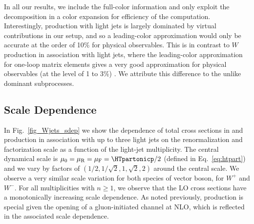 In all our results, we include the full-color information and only
exploit the decomposition in a color expansion for efficiency of the
computation. Interestingly, \Wbb{} production with light jets is largely dominated by virtual
contributions in our setup, and so a leading-color approximation would only be accurate at the
order of 10\% for physical observables. This is in contrast to $W$ production in association with light
jets, where the leading-color approximation for one-loop matrix elements gives a very good
approximation for physical observables (at the level of 1 to
3\%) \cite{BH:W5j}. We attribute this difference to the unlike dominant subprocesses.


\subsection{Scale Dependence}\label{wscale}
In Fig.~\ref{fig_Wjets_sdep} we show the dependence of total cross sections in
\Wbbm{} and \Wbbp{} production in association with up to three light jets on the
renormalization and factorization scale as a function of the light-jet multiplicity. The central dynamical scale is
$\mu_0=\mu_{\textrm R}=\mu_{\textrm F}=\HTpartonicp/2$ (defined in
Eq.~\eqref{eq:htpart}) and we vary by factors of $(1/2,1/\sqrt{2},1,\sqrt{2},2)$ around the central scale. We observe a very similar scale variation for both species of vector boson, for $W^+$ and
$W^-$. For all multiplicities with $n\geq 1$, we observe that the LO cross sections have a monotonically increasing
scale dependence. As noted previously, \Wbb{} production is special given the opening of a
gluon-initiated channel at NLO, which is reflected in the associated scale dependence.


